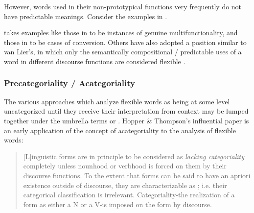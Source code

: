 
\noindent However, words used in their non-prototypical functions very frequently do not have predictable meanings. Consider the examples in .



\citeauthor{Lier2012} takes examples like those in  to be instances of genuine multifunctionality, and those in  to be cases of conversion. Others have also adopted a position similar to van Lier's, in which only the semantically compositional / predictable uses of a word in different discourse functions are considered flexible \parencites[pages for compositionality criterion]{EvansOsada2005} .

\subsubsection{Precategoriality / Acategoriality}
\label{sec:2.3.1.4}

The various approaches which analyze flexible words as being at some level uncategorized until they receive their interpretation from context may be lumped together under the umbrella terms  or . Hopper \& Thompson's influential paper \citeyear{HopperThompson1984} is an early application of the concept of acategoriality to the analysis of flexible words:

\blockquote[{\cite[747]{HopperThompson1984}}]{[L]inguistic forms are in principle to be considered as \emph{lacking categoriality} completely unless nounhood or verbhood is forced on them by their discourse functions. To the extent that forms can be said to have an apriori existence outside of discourse, they are characterizable as ; i.e. their categorical classification is irrelevant. Categoriality-the realization of a form as either a N or a V-is imposed on the form by discourse.}


